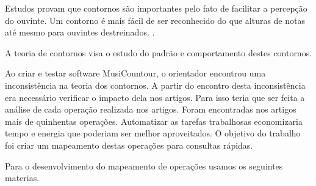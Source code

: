 \documentclass[11pt]{article}
\begin{document}
Estudos provam que contornos são importantes pelo fato de facilitar a
percepção do ouvinte. Um contorno é mais fácil de ser reconhecido do
que alturas de notas até mesmo para ouvintes destreinados.
\cite[p. 225]{Marvin1987}.

A teoria de contornos visa o estudo do padrão e comportamento destes contornos.


Ao criar e testar software MusiCountour, o orientador encontrou
uma inconsistência na teoria dos contornos.
A partir do encontro desta inconsistência era necessário verificar o
impacto dela nos artigos. Para isso teria que ser feita a análise de cada
operação realizada nos artigos.
Foram encontradas nos artigos mais de quinhentas
operações. Automatizar as tarefas trabalhosas economizaria tempo e
energia que poderiam ser melhor aproveitados. O objetivo do trabalho
foi criar um mapeamento destas operações para consultas rápidas.

\label{sec:materiais}

Para o desenvolvimento do mapeamento de operações usamos os seguintes
materias.

\end{document}
